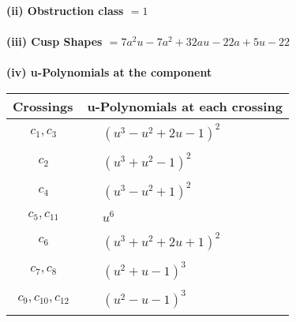 \documentclass[1p]{elsarticle_modified}
\theoremstyle{definition}
\begin{document}
\flushleft \textbf{(ii) Obstruction class $= 1$}\\~\\
\flushleft \textbf{(iii) Cusp Shapes $= 7 a^2 u-7 a^2+32 a u-22 a+5 u-22$}\\~\\
\newpage\renewcommand{\arraystretch}{1}
\flushleft \textbf{(iv) u-Polynomials at the component}\newline \\
\begin{tabular}{m{50pt}|m{274pt}}
Crossings & \hspace{64pt}u-Polynomials at each crossing \\
\hline $$\begin{aligned}c_{1},c_{3}\end{aligned}$$&$\begin{aligned}
&(u^3- u^2+2 u-1)^2
\end{aligned}$\\
\hline $$\begin{aligned}c_{2}\end{aligned}$$&$\begin{aligned}
&(u^3+u^2-1)^2
\end{aligned}$\\
\hline $$\begin{aligned}c_{4}\end{aligned}$$&$\begin{aligned}
&(u^3- u^2+1)^2
\end{aligned}$\\
\hline $$\begin{aligned}c_{5},c_{11}\end{aligned}$$&$\begin{aligned}
&u^6
\end{aligned}$\\
\hline $$\begin{aligned}c_{6}\end{aligned}$$&$\begin{aligned}
&(u^3+u^2+2 u+1)^2
\end{aligned}$\\
\hline $$\begin{aligned}c_{7},c_{8}\end{aligned}$$&$\begin{aligned}
&(u^2+u-1)^3
\end{aligned}$\\
\hline $$\begin{aligned}c_{9},c_{10},c_{12}\end{aligned}$$&$\begin{aligned}
&(u^2- u-1)^3
\end{aligned}$\\
\hline
\end{tabular}\\~\\
\end{document}
